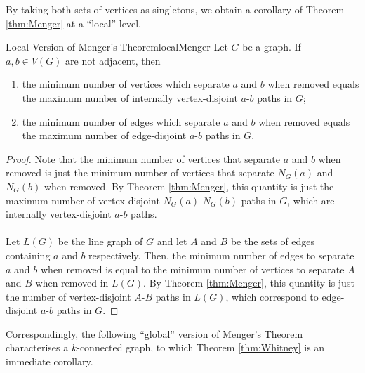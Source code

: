 \documentclass[math, code]{amznotes}
\theoremstyle{remark}
\begin{document}
By taking both sets of vertices as singletons, we obtain a corollary of Theorem \ref{thm:Menger} at a ``local'' level.
\begin{corbox}{Local Version of Menger's Theorem}{localMenger}
    Let $G$ be a graph. If $a, b \in V(G)$ are not adjacent, then 
    \begin{enumerate}
        \item the minimum number of vertices which separate $a$ and $b$ when removed equals the maximum number of internally vertex-disjoint $a$-$b$ paths in $G$;
        \item the minimum number of edges which separate $a$ and $b$ when removed equals the maximum number of edge-disjoint $a$-$b$ paths in $G$.
    \end{enumerate}
    \tcblower
    \begin{proof}
        Note that the minimum number of vertices that separate $a$ and $b$ when removed is just the minimum number of vertices that separate $N_G(a)$ and $N_G(b)$ when removed. By Theorem \ref{thm:Menger}, this quantity is just the maximum number of vertex-disjoint $N_G(a)$-$N_G(b)$ paths in $G$, which are internally vertex-disjoint $a$-$b$ paths.
        \\\\
        Let $L(G)$ be the line graph of $G$ and let $A$ and $B$ be the sets of edges containing $a$ and $b$ respectively. Then, the minimum number of edges to separate $a$ and $b$ when removed is equal to the minimum number of vertices to separate $A$ and $B$ when removed in $L(G)$. By Theorem \ref{thm:Menger}, this quantity is just the number of vertex-disjoint $A$-$B$ paths in $L(G)$, which correspond to edge-disjoint $a$-$b$ paths in $G$.
    \end{proof}
\end{corbox}
Correspondingly, the following ``global'' version of Menger's Theorem characterises a $k$-connected graph, to which Theorem \ref{thm:Whitney} is an immediate corollary.
\end{document}
